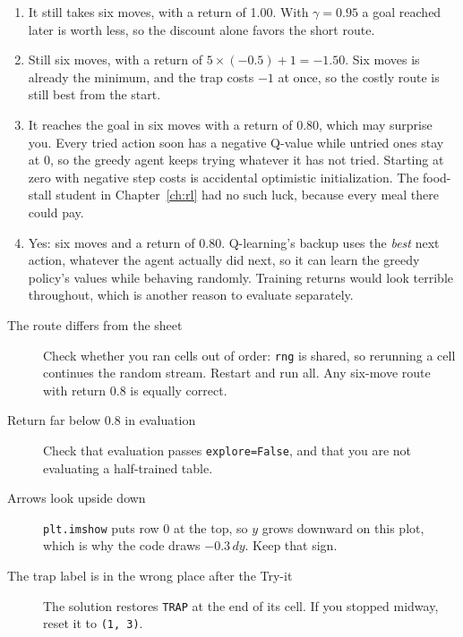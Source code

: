 \begin{expectedfindings}
\begin{enumerate}
  \item It still takes six moves, with a return of 1.00. With $\gamma=0.95$ a goal reached later is worth less, so the discount alone favors the short route.
  \item Still six moves, with a return of $5\times(-0.5)+1=-1.50$. Six moves is already the minimum, and the trap costs $-1$ at once, so the costly route is still best from the start.
  \item It reaches the goal in six moves with a return of 0.80, which may surprise you. Every tried action soon has a negative Q-value while untried ones stay at 0, so the greedy agent keeps trying whatever it has not tried. Starting at zero with negative step costs is accidental optimistic initialization. The food-stall student in Chapter~\ref{ch:rl} had no such luck, because every meal there could pay.
  \item Yes: six moves and a return of 0.80. Q-learning's backup uses the \emph{best} next action, whatever the agent actually did next, so it can learn the greedy policy's values while behaving randomly. Training returns would look terrible throughout, which is another reason to evaluate separately.
\end{enumerate}
\end{expectedfindings}

\begin{troubleshoot}
\begin{description}
  \item[The route differs from the sheet] Check whether you ran cells out of order: \texttt{rng} is shared, so rerunning a cell continues the random stream. Restart and run all. Any six-move route with return 0.8 is equally correct.
  \item[Return far below 0.8 in evaluation] Check that evaluation passes \texttt{explore=False}, and that you are not evaluating a half-trained table.
  \item[Arrows look upside down] \texttt{plt.imshow} puts row 0 at the top, so $y$ grows downward on this plot, which is why the code draws $-0.3\,dy$. Keep that sign.
  \item[The trap label is in the wrong place after the Try-it] The solution restores \texttt{TRAP} at the end of its cell. If you stopped midway, reset it to \texttt{(1, 3)}.
\end{description}
\end{troubleshoot}


